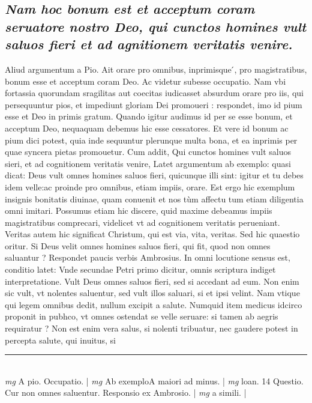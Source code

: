 \documentclass{article}
\begin{document}
\begin{pages}
\subsection*{\textit{Nam hoc bonum est et acceptum coram seruatore nostro Deo, qui cunctos homines vult saluos fieri et ad agnitionem veritatis venire. }}\pstart Aliud argumentum a Pio. Ait orare pro omnibus, inprimisque ́, pro magistratibus, bonum esse et acceptum coram Deo. Ac videtur subesse occupatio. Nam vbi fortassia quorundam sragilitas aut coecitas iudicasset absurdum orare pro iis, qui persequuntur pios, et impediunt gloriam Dei promoueri : respondet, imo id pium esse et Deo in primis gratum. Quando igitur audimus id per se esse bonum, et acceptum Deo, nequaquam debemus hic esse cessatores. Et vere id bonum ac pium dici potest, quia inde sequuntur plerunque  multa bona, et ea inprimis per quae syncera pietas promouetur. Cum addit, Qui cunctos homines vult saluos sieri, et ad cognitionem veritatis venire, Latet argumentum ab exemplo: quasi dicat: Deus vult omnes homines saluos fieri, quicunque illi sint: igitur et tu debes idem velle:ac proinde pro omnibus, etiam impiis, orare. Est ergo hic exemplum insignis bonitatis diuinae, quam conuenit et nos tùm affectu tum etiam diligentia omni imitari. Possumus etiam hic discere, quid maxime debeamus impiis magistratibus comprecari, videlicet vt ad cognitionem veritatis perueniant. Veritas autem hic significat Christum, qui est via, vita, veritas. Sed hic quaestio oritur. Si Deus velit omnes homines saluos fieri, qui fit, quod non omnes saluantur ? Respondet paucis verbis Ambrosius. In omni locutione sensus est, conditio latet: Vnde secundae Petri primo dicitur, omnis scriptura indiget interpretatione. Vult Deus omnes saluos fieri, sed si accedant ad eum. Non enim sic vult, vt nolentes saluentur, sed vult illos saluari, si et ipsi velint. Nam vtique qui legem omnibus dedit, nullum excipit a salute. Numquid item medicus idcirco proponit in pubhco, vt omnes ostendat se velle seruare: si tamen ab aegris requiratur ? Non est enim vera salus, si nolenti tribuatur, nec gaudere potest in percepta salute, qui inuitus, si  \pend
\vspace{0.5cm}\noindent
\vspace{0.2cm}\rule{1cm}{0.2pt}\\ 
\hspace{0.2cm}\textit{mg}
\footnotesize A pio. Occupatio. 
\normalsize| 
\hspace{0.2cm}\textit{mg}
\footnotesize Ab exemploA maiori ad minus. 
\normalsize| 
\hspace{0.2cm}\textit{mg}
\footnotesize loan. 14 Questio. Cur non omnes saluentur. Responsio ex Ambrosio. 
\normalsize| 
\hspace{0.2cm}\textit{mg}
\footnotesize a simili. 
\normalsize| 

\end{pages}
\end{document}
